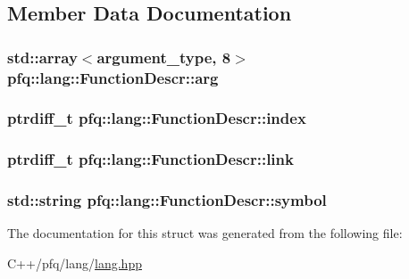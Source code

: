 \subsection{Member Data Documentation}
\hypertarget{structpfq_1_1lang_1_1FunctionDescr_af1fe3a86f26dc3f74532ce718a195006}{
\subsubsection[{arg}]{\setlength{\rightskip}{0pt plus 5cm}std\+::array$<${\bf argument\+\_\+type}, 8$>$ pfq\+::lang\+::\+Function\+Descr\+::arg}}\label{structpfq_1_1lang_1_1FunctionDescr_af1fe3a86f26dc3f74532ce718a195006}
\hypertarget{structpfq_1_1lang_1_1FunctionDescr_a4d9c2d281e407d12964765e3e83d96a5}{
\subsubsection[{index}]{\setlength{\rightskip}{0pt plus 5cm}ptrdiff\+\_\+t pfq\+::lang\+::\+Function\+Descr\+::index}}\label{structpfq_1_1lang_1_1FunctionDescr_a4d9c2d281e407d12964765e3e83d96a5}
\hypertarget{structpfq_1_1lang_1_1FunctionDescr_a2a4e8faafeb322d43070236093d2181b}{
\subsubsection[{link}]{\setlength{\rightskip}{0pt plus 5cm}ptrdiff\+\_\+t pfq\+::lang\+::\+Function\+Descr\+::link}}\label{structpfq_1_1lang_1_1FunctionDescr_a2a4e8faafeb322d43070236093d2181b}
\hypertarget{structpfq_1_1lang_1_1FunctionDescr_a21f51c65f55dddd54de1171d8914c030}{
\subsubsection[{symbol}]{\setlength{\rightskip}{0pt plus 5cm}std\+::string pfq\+::lang\+::\+Function\+Descr\+::symbol}}\label{structpfq_1_1lang_1_1FunctionDescr_a21f51c65f55dddd54de1171d8914c030}


The documentation for this struct was generated from the following file\+:\begin{DoxyCompactItemize}
\item 
C++/pfq/lang/\hyperlink{lang_8hpp}{lang.\+hpp}\end{DoxyCompactItemize}
